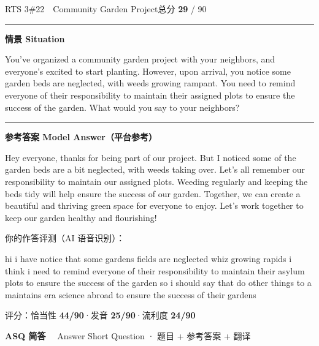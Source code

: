 \documentclass[11pt]{article}
\newcommand{\spart}[1]{\textcolor{cPartial}{\bfseries #1}} %
\newcommand{\szero}[1]{\textcolor{cWrong}{\bfseries #1}}   %
\newcommand{\ptesub}[1]{%
  \par\needspace{2\baselineskip}\smallskip
  {\color{cAccent}\rule[-0.2ex]{3pt}{1.05em}}\hspace{6pt}%
  {\bfseries\color{cHead}#1}\par\nopagebreak\smallskip}
\newcommand{\ptetask}[2]{%
  \needspace{4\baselineskip}\medskip
  \begin{tcolorbox}[enhanced, colback=cHead, colframe=cHead, sharp corners,
     left=12pt, right=12pt, top=5pt, bottom=5pt, boxrule=0pt]
    {\large\bfseries\color{white} #1}\ \ {\color{white!80} #2}
  \end{tcolorbox}\smallskip}
\newcommand{\sg}[1]{\textcolor{cSpkGood}{#1}}   %
\newcommand{\sy}[1]{\textcolor{cSpkOk}{#1}}     %
\newcommand{\sr}[1]{\textcolor{cSpkBad}{#1}}    %
\begin{document}
\begin{qblock}{RTS 3\quad \#22\ \ Community Garden Project}{总分 \textcolor{cAccent}{\bfseries 29} / 90}
\ptesub{情景 Situation}
\begin{promptbox}
You've organized a community garden project with your neighbors, and everyone's excited to start planting. However, upon arrival, you notice some garden beds are neglected, with weeds growing rampant. You need to remind everyone of their responsibility to maintain their assigned plots to ensure the success of the garden. What would you say to your neighbors?
\end{promptbox}
\ptesub{参考答案 Model Answer（平台参考）}
\begin{modelbox}
Hey everyone, thanks for being part of our project. But I noticed some of the garden beds are a bit neglected, with weeds taking over. Let's all remember our responsibility to maintain our assigned plots. Weeding regularly and keeping the beds tidy will help ensure the success of our garden. Together, we can create a beautiful and thriving green space for everyone to enjoy. Let's work together to keep our garden healthy and flourishing!
\end{modelbox}
\smallskip\par{\footnotesize\color{gray}你的作答评测（AI 语音识别）：}
\begin{asrbox}
\sg{hi i have notice that some gardens fields} \sy{are} \sr{neglected} \sy{whiz} \sy{growing rapids i think i need to remind everyone of their} \sg{responsibility to} \sr{maintain} \sg{their} \sr{asylum} \sy{plots} \sg{to ensure the} \sg{success of the garden so i should say that} \sr{do} \sg{other things} \sy{to a} \sr{maintains era} \sy{science} \sr{abroad} \sg{to ensure the success of their} \sg{gardens}
\end{asrbox}
{\small 评分：恰当性 \spart{44/90}\quad·\quad 发音 \szero{25/90}\quad·\quad 流利度 \szero{24/90}}
\end{qblock}

\ptetask{ASQ 简答}{Answer Short Question · 题目 + 参考答案 + 翻译}
\end{document}
